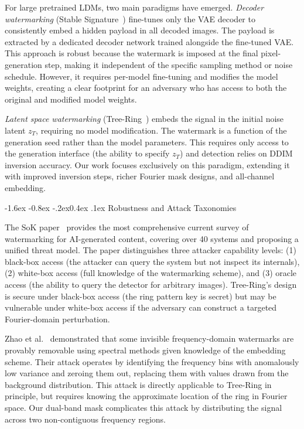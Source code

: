 \documentclass[10pt,twocolumn]{article}
\makeatletter
\renewcommand\subsection{\@startsection{subsection}{2}{\z@}%
  {-1.6ex \@plus -0.8ex \@minus -.2ex}{0.4ex \@plus .1ex}%
  {\normalfont\normalsize\itshape}}
\makeatother
\begin{document}
For large pretrained LDMs, two main paradigms have emerged.
\emph{Decoder watermarking} (Stable Signature~\cite{fernandez2023stablediffusion})
fine-tunes only the VAE decoder to consistently embed a hidden payload
in all decoded images.
The payload is extracted by a dedicated decoder network trained
alongside the fine-tuned VAE.
This approach is robust because the watermark is imposed at the final
pixel-generation step, making it independent of the specific sampling
method or noise schedule.
However, it requires per-model fine-tuning and modifies the model
weights, creating a clear footprint for an adversary who has access
to both the original and modified model weights.

\emph{Latent space watermarking} (Tree-Ring~\cite{wen2023treering})
embeds the signal in the initial noise latent $z_T$, requiring no
model modification.
The watermark is a function of the generation seed rather than the
model parameters.
This requires only access to the generation interface (the ability to
specify $z_T$) and detection relies on DDIM inversion accuracy.
Our work focuses exclusively on this paradigm, extending it with
improved inversion steps, richer Fourier mask designs, and all-channel
embedding.

\subsection{Robustness and Attack Taxonomies}

The SoK paper~\cite{zhao2025sok} provides the most comprehensive current
survey of watermarking for AI-generated content, covering over 40
systems and proposing a unified threat model.
The paper distinguishes three attacker capability levels: (1) black-box
access (the attacker can query the system but not inspect its internals),
(2) white-box access (full knowledge of the watermarking scheme),
and (3) oracle access (the ability to query the detector for arbitrary
images).
Tree-Ring's design is secure under black-box access (the ring pattern
key is secret) but may be vulnerable under white-box access if the
adversary can construct a targeted Fourier-domain perturbation.

Zhao et al.~\cite{zhao2023invisible} demonstrated that some invisible
frequency-domain watermarks are provably removable using spectral
methods given knowledge of the embedding scheme.
Their attack operates by identifying the frequency bins with
anomalously low variance and zeroing them out, replacing them with
values drawn from the background distribution.
This attack is directly applicable to Tree-Ring in principle, but
requires knowing the approximate location of the ring in Fourier space.
Our dual-band mask complicates this attack by distributing the signal
across two non-contiguous frequency regions.
\end{document}
